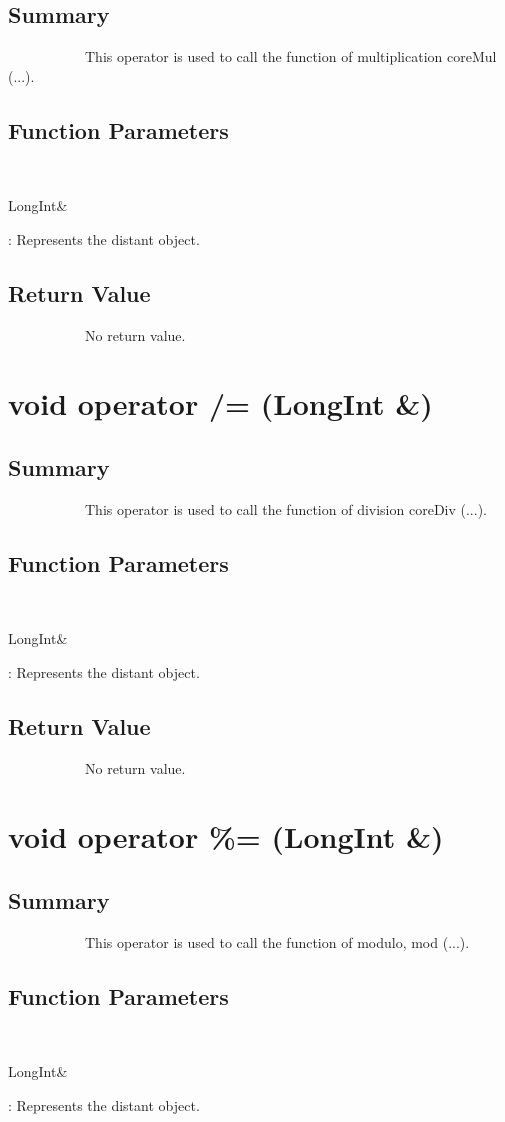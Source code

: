 \documentclass[11pt]{report}
\begin{document}
	\subsection{Summary}
~~~~~~~~~~~This operator is used to call the function of multiplication coreMul (...).
	\subsection{Function Parameters}
~~~~~~~~~~~\begin{bf}LongInt\&\end{bf}: Represents the distant object.

\subsection{Return Value}
~~~~~~~~~~~No return value.

\section{ void operator /= (LongInt \&)}
	\subsection{Summary}
~~~~~~~~~~~This operator is used to call the function of division coreDiv (...).
	\subsection{Function Parameters}
~~~~~~~~~~~\begin{bf}LongInt\&\end{bf}: Represents the distant object.

\subsection{Return Value}
~~~~~~~~~~~No return value.


\section{ void operator \%= (LongInt \&)}
	\subsection{Summary}
~~~~~~~~~~~This operator is used to call the function of modulo,  mod (...).
	\subsection{Function Parameters}
~~~~~~~~~~~\begin{bf}LongInt\&\end{bf}:  Represents the distant object.
\end{document}

